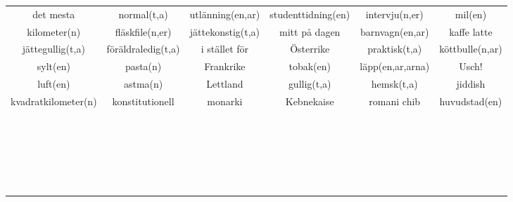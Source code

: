 \begin{center}
\begin{adjustwidth}{-2.7cm}{}
\begin{tabular}{|c c c c c c|}
            det mesta & normal(t,a) & utlänning(en,ar) & studenttidning(en) & intervju(n,er) & mil(en) \\
            kilometer(n) & fläskfile(n,er) & jättekonstig(t,a) & mitt på dagen & barnvagn(en,ar) & kaffe latte \\
            jättegullig(t,a) & föräldraledig(t,a) & i stället för & Österrike & praktisk(t,a) & köttbulle(n,ar) \\
            sylt(en) & pasta(n) & Frankrike & tobak(en) & läpp(en,ar,arna) & Usch! \\
            luft(en) & astma(n) & Lettland & gullig(t,a) & hemsk(t,a) & jiddish \\
            kvadratkilometer(n) & konstitutionell & monarki & Kebnekaise & romani chib & huvudstad(en) \\
             &  &  &  &  &  \\
             &  &  &  &  &  \\
             &  &  &  &  &  \\
             &  &  &  &  &  \\
             &  &  &  &  &  \\
             &  &  &  &  &  \\
             &  &  &  &  &  \\
             &  &  &  &  &  \\
             &  &  &  &  &  \\
             &  &  &  &  &  \\
             &  &  &  &  &  \\
             &  &  &  &  &  \\
             &  &  &  &  &  \\
             &  &  &  &  &  \\
             &  &  &  &  &  \\
             &  &  &  &  &  \\
             &  &  &  &  &  \\
             &  &  &  &  &  \\
             &  &  &  &  &  \\
             &  &  &  &  &  \\
             &  &  &  &  &  \\
             &  &  &  &  &  \\
             &  &  &  &  &  \\
            \hline
        \end{tabular}
    \end{adjustwidth}
\end{center}


